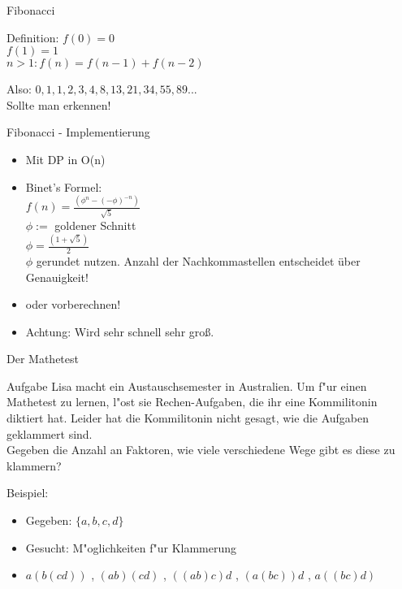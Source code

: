 \documentclass[18pt]{beamer}
\begin{document}
\begin{frame}{Fibonacci}
\begin{block}{Definition:}
\(f(0)=0\)\\
\(f(1)=1\)\\
\(n>1: f(n)=f(n-1)+f(n-2)\)\\
\end{block}
Also: \(0, 1, 1, 2, 3, 4, 8, 13, 21, 34, 55, 89...\)\\

Sollte man erkennen!
\end{frame}


\begin{frame}{Fibonacci - Implementierung}
\begin{itemize}
\item Mit DP in O(n)
\item Binet's Formel: \\
\(f(n) = \frac{(\phi^{n} - (-\phi)^{-n}) }{ \sqrt{5}}\)\\
\(\phi :=\)  goldener Schnitt\\
\(\phi = \frac{ (1+\sqrt{5})}{2}\)\\
\(\phi\) gerundet nutzen. Anzahl der Nachkommastellen entscheidet über Genauigkeit!

\item oder vorberechnen!\\
\item Achtung: Wird sehr schnell sehr groß.
\end{itemize}
\end{frame}

\begin{frame}{Der Mathetest}
\begin{block}{Aufgabe}
Lisa macht ein Austauschsemester in Australien. Um f"ur einen Mathetest zu lernen, l"ost sie Rechen-Aufgaben, die ihr eine Kommilitonin diktiert hat. Leider hat die Kommilitonin nicht gesagt, wie die Aufgaben geklammert sind. \\
Gegeben die Anzahl an Faktoren, wie viele verschiedene Wege gibt es diese zu klammern?
\end{block}
Beispiel:
\begin{itemize}
\item Gegeben: $\lbrace a, b, c, d \rbrace$
\item Gesucht: M"oglichkeiten f"ur Klammerung
\item $ a \left( b \left( c d \right) \right) $ , $\left( a b \right) \left( c d \right) $ , $\left( \left( a b \right) c \right) d$ , $\left( a \left( b  c \right) \right) d $ , $ a \left( \left( b  c \right) d \right) $
\end{itemize}
\end{frame}
\end{document}
